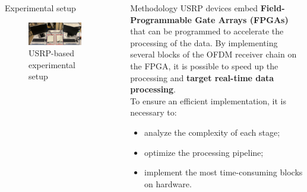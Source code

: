 \documentclass[final]{beamer}
\newlength{\sepwid}
\newlength{\onecolwid}
\begin{document}
\begin{frame}[t,fragile]
\begin{columns}[t]
\begin{column}{\onecolwid}
\begin{block}{Experimental setup}
    \vspace{0.2in}

    \begin{figure}[!ht]
      \centering
      \includegraphics[width=\linewidth]{img/setup.pdf}
      \caption{USRP-based experimental setup}
    \end{figure}
  \end{block}

\end{column}

\begin{column}{\sepwid}\end{column} %

\begin{column}{\onecolwid}

  \vspace{-0.5in}

  \begin{block}{Methodology}
    USRP devices embed \textbf{Field-Programmable Gate Arrays (FPGAs)} that can be programmed to accelerate the processing of the data. 
    By implementing several blocks of the OFDM receiver chain %
    on the FPGA, it is possible to speed up the processing and \textbf{target real-time data processing}. \\ \vspace{0.2in}
    To ensure an efficient implementation, it is necessary to: \vspace{-0.2in}
    \begin{itemize}
      \item \hspace{0.2cm} analyze the complexity of each stage;
      \item \hspace{0.2cm} optimize the processing pipeline;
      \item \hspace{0.2cm} implement the most time-consuming blocks on hardware.
    \end{itemize}


\end{block}
\end{column}
\end{columns}
\end{frame}
\end{document}
